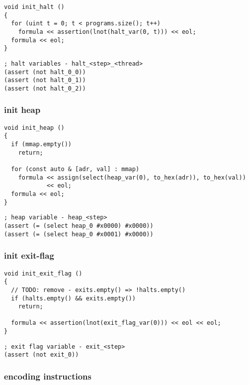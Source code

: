 \begin{lstlisting}[style=c++]
void init_halt ()
{
  for (uint t = 0; t < programs.size(); t++)
    formula << assertion(lnot(halt_var(0, t))) << eol;
  formula << eol;
}
\end{lstlisting}

\begin{lstlisting}[language=SMTLib]
; halt variables - halt_<step>_<thread>
(assert (not halt_0_0))
(assert (not halt_0_1))
(assert (not halt_0_2))
\end{lstlisting}

\subsubsection{init heap}

\begin{lstlisting}[style=c++]
void init_heap ()
{
  if (mmap.empty())
    return;

  for (const auto & [adr, val] : mmap)
    formula << assign(select(heap_var(0), to_hex(adr)), to_hex(val))
            << eol;
  formula << eol;
}
\end{lstlisting}

\begin{lstlisting}[language=SMTLib]
; heap variable - heap_<step>
(assert (= (select heap_0 #x0000) #x0000))
(assert (= (select heap_0 #x0001) #x0000))
\end{lstlisting}

\subsubsection{init exit-flag}

\begin{lstlisting}[style=c++]
void init_exit_flag ()
{
  // TODO: remove - exits.empty() => !halts.empty()
  if (halts.empty() && exits.empty())
    return;

  formula << assertion(lnot(exit_flag_var(0))) << eol << eol;
}
\end{lstlisting}

\begin{lstlisting}[language=SMTLib]
; exit flag variable - exit_<step>
(assert (not exit_0))
\end{lstlisting}

\subsubsection{encoding instructions}

